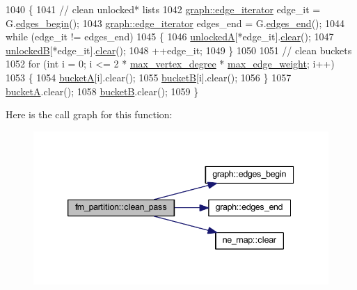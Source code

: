 \begin{DoxyCode}
1040 \{
1041     \textcolor{comment}{// clean unlocked* lists}
1042     \mbox{\hyperlink{classgraph_a818d3766018eb0af91d520ce2150203c}{graph::edge\_iterator}} edge\_it = G.\mbox{\hyperlink{classgraph_a7ba35a4c4e8343ffb27ed6d9703c6f18}{edges\_begin}}();
1043     \mbox{\hyperlink{classgraph_a818d3766018eb0af91d520ce2150203c}{graph::edge\_iterator}} edges\_end = G.\mbox{\hyperlink{classgraph_aea8d7f976b85b6137f52d915e26639f6}{edges\_end}}();
1044     \textcolor{keywordflow}{while} (edge\_it != edges\_end)
1045     \{
1046     \mbox{\hyperlink{classfm__partition_a9d75a1d63f711a0c66ae7f5bc181cd8b}{unlockedA}}[*edge\_it].\mbox{\hyperlink{classne__map_aebe555c23769c6dcc869b5ac7fae6a9c}{clear}}();
1047     \mbox{\hyperlink{classfm__partition_a74865bf3e6b6f73350c43c3ad9dfda96}{unlockedB}}[*edge\_it].\mbox{\hyperlink{classne__map_aebe555c23769c6dcc869b5ac7fae6a9c}{clear}}();
1048     ++edge\_it;
1049     \}
1050     
1051     \textcolor{comment}{// clean buckets}
1052     \textcolor{keywordflow}{for} (\textcolor{keywordtype}{int} i = 0; i <= 2 * \mbox{\hyperlink{classfm__partition_ab6a4beaa10548ce9f1a0e8e441492ef9}{max\_vertex\_degree}} * 
      \mbox{\hyperlink{classfm__partition_a5b37b4ac8d96236f274a57a46d653e25}{max\_edge\_weight}}; i++)
1053     \{
1054     \mbox{\hyperlink{classfm__partition_a399955e0c84bad93cb82b5ffe8cf4a04}{bucketA}}[i].clear();
1055     \mbox{\hyperlink{classfm__partition_ae6a5b5f3f2d95ea229882e861ccfc9e4}{bucketB}}[i].clear();
1056     \}
1057     \mbox{\hyperlink{classfm__partition_a399955e0c84bad93cb82b5ffe8cf4a04}{bucketA}}.clear();
1058     \mbox{\hyperlink{classfm__partition_ae6a5b5f3f2d95ea229882e861ccfc9e4}{bucketB}}.clear();
1059 \}
\end{DoxyCode}
Here is the call graph for this function\+:\nopagebreak
\begin{figure}[H]
\begin{center}
\leavevmode
\includegraphics[width=339pt]{classfm__partition_a15197263e5318f824e0cde66ea9132b7_cgraph}
\end{center}
\end{figure}
